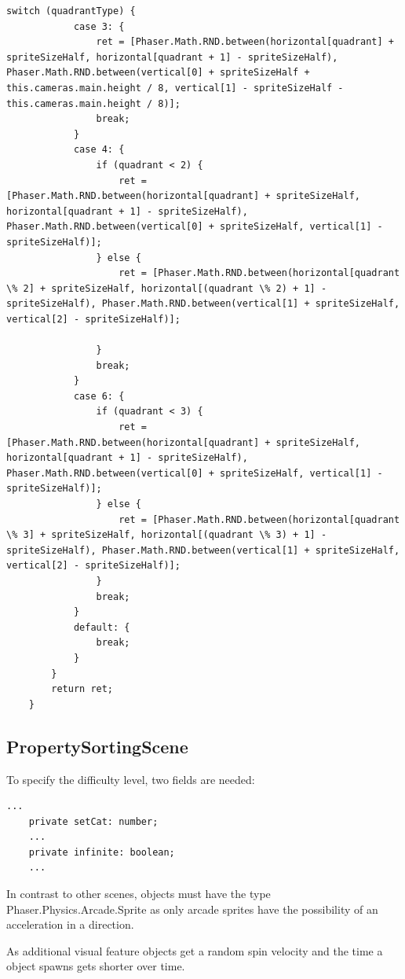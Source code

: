 \begin{lstlisting}[style=TypeScript, caption={returnQuad() (sortingScene.ts)}]
        switch (quadrantType) {
            case 3: {
                ret = [Phaser.Math.RND.between(horizontal[quadrant] + spriteSizeHalf, horizontal[quadrant + 1] - spriteSizeHalf), Phaser.Math.RND.between(vertical[0] + spriteSizeHalf + this.cameras.main.height / 8, vertical[1] - spriteSizeHalf - this.cameras.main.height / 8)];
                break;
            }
            case 4: {
                if (quadrant < 2) {
                    ret = [Phaser.Math.RND.between(horizontal[quadrant] + spriteSizeHalf, horizontal[quadrant + 1] - spriteSizeHalf), Phaser.Math.RND.between(vertical[0] + spriteSizeHalf, vertical[1] - spriteSizeHalf)];
                } else {
                    ret = [Phaser.Math.RND.between(horizontal[quadrant \% 2] + spriteSizeHalf, horizontal[(quadrant \% 2) + 1] - spriteSizeHalf), Phaser.Math.RND.between(vertical[1] + spriteSizeHalf, vertical[2] - spriteSizeHalf)];

                }
                break;
            }
            case 6: {
                if (quadrant < 3) {
                    ret = [Phaser.Math.RND.between(horizontal[quadrant] + spriteSizeHalf, horizontal[quadrant + 1] - spriteSizeHalf), Phaser.Math.RND.between(vertical[0] + spriteSizeHalf, vertical[1] - spriteSizeHalf)];
                } else {
                    ret = [Phaser.Math.RND.between(horizontal[quadrant \% 3] + spriteSizeHalf, horizontal[(quadrant \% 3) + 1] - spriteSizeHalf), Phaser.Math.RND.between(vertical[1] + spriteSizeHalf, vertical[2] - spriteSizeHalf)];
                }
                break;
            }
            default: {
                break;
            }
        }
        return ret;
    }
\end{lstlisting}

\subsection{PropertySortingScene}\label{subsec:propertysortingscene}
To specify the difficulty level, two fields are needed:
\begin{lstlisting}[style=TypeScript, caption={Level fields (propertySortingScene.ts)}]
    ...
    private setCat: number;
    ...
    private infinite: boolean;
    ...
\end{lstlisting}

In contrast to other scenes, objects must have the type Phaser.Physics.Arcade.Sprite as only arcade sprites have the
possibility of an acceleration in a direction.

As additional visual feature objects get a random spin velocity and the time a object spawns gets shorter over time.

